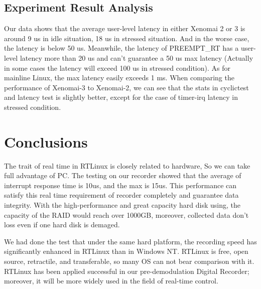\documentclass[10pt,a4paper]{article}
\begin{document}
\begin{multicols}{2}
\subsection{Experiment Result Analysis}
Our data shows that the average user-level latency in either Xenomai 2 or 3 is around 9 us in idle situation, 18 us in stressed situation. And in the worse case, the latency is below 50 us. Meanwhile, the latency of PREEMPT\_RT has a user-level latency more than 20 us and can't guarantee a 50 us max latency (Actually in some cases the latency will exceed 100 us in stressed condition).  As for mainline Linux, the max latency easily exceeds 1 ms. When comparing the performance of Xenomai-3 to Xenomai-2, we can see that the stats in cyclictest and latency test is slightly better, except for the case of timer-irq latency in stressed condition.

\section{Conclusions}
The trait of real time in RTLinux is closely related to hardware, So we can take full advantage of PC. The testing on our recorder showed that the average of interrupt response time is 10us, and the max  is 15us. This performance can satisfy this real time requirement of recorder completely and guarantee data integrity. With the high-performance and  great capacity hard disk using, the capacity of the RAID would reach over 1000GB, moreover, collected data don't loss even if one hard disk is demaged.

We had done the test that  under the same hard platform, the recording speed has significantly enhanced in RTLinux than in Windows NT. RTLinux is free, open source, retractile, and transferable, so many OS can not bear comparison with it. RTLinux has been applied successful in our pre-demodulation Digital Recorder; moreover, it will be more widely used in the field of real-time control.


\begin{thebibliography}{9}%
\end{thebibliography}

\end{multicols}
\end{document}
